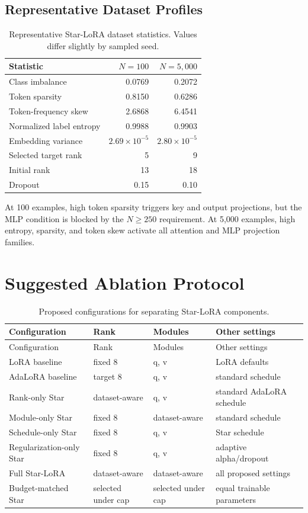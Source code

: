 \section{Representative Dataset Profiles}

\begin{table}[H]
\centering
\caption{Representative Star-LoRA dataset statistics. Values differ slightly by sampled seed.}
\label{tab:profiles}
\begin{tabular}{@{}lrr@{}}
\toprule
Statistic & $N=100$ & $N=5,000$\\
\midrule
Class imbalance & 0.0769 & 0.2072\\
Token sparsity & 0.8150 & 0.6286\\
Token-frequency skew & 2.6868 & 6.4541\\
Normalized label entropy & 0.9988 & 0.9903\\
Embedding variance & $2.69\times10^{-5}$ & $2.80\times10^{-5}$\\
Selected target rank & 5 & 9\\
Initial rank & 13 & 18\\
Dropout & 0.15 & 0.10\\
\bottomrule
\end{tabular}
\end{table}

At 100 examples, high token sparsity triggers key and output projections, but the MLP condition is
blocked by the $N\ge250$ requirement. At 5,000 examples, high entropy, sparsity, and token skew
activate all attention and MLP projection families.

\chapter{Suggested Ablation Protocol}

\begin{longtable}{@{}p{}p{}p{}p{}@{}}
\caption{Proposed configurations for separating Star-LoRA components.}\\
\toprule
Configuration & Rank & Modules & Other settings\\
\midrule
\endfirsthead
\toprule
Configuration & Rank & Modules & Other settings\\
\midrule
\endhead
LoRA baseline & fixed 8 & q, v & LoRA defaults\\
AdaLoRA baseline & target 8 & q, v & standard schedule\\
Rank-only Star & dataset-aware & q, v & standard AdaLoRA schedule\\
Module-only Star & fixed 8 & dataset-aware & standard schedule\\
Schedule-only Star & fixed 8 & q, v & Star schedule\\
Regularization-only Star & fixed 8 & q, v & adaptive alpha/dropout\\
Full Star-LoRA & dataset-aware & dataset-aware & all proposed settings\\
Budget-matched Star & selected under cap & selected under cap & equal trainable parameters\\
\bottomrule
\end{longtable}

